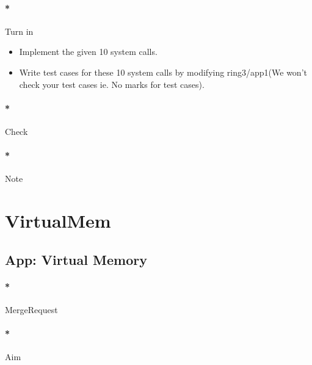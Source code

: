 \documentclass[]{article}
\newenvironment{Shaded}{}{}
\newcommand{\ExtensionTok}[1]{{#1}}
\newcommand{\NormalTok}[1]{{#1}}
\providecommand{\tightlist}{%
  \setlength{\itemsep}{0pt}\setlength{\parskip}{0pt}}
\let\oldparagraph\paragraph
\renewcommand{\paragraph}[1]{\oldparagraph{#1}\mbox{}}
\begin{document}
\paragraph*{Turn in}\label{turn-in-12}

\begin{itemize}
\tightlist
\item
  Implement the given 10 system calls.
\item
  Write test cases for these 10 system calls by modifying ring3/app1(We
  won't check your test cases ie. No marks for test cases).
\end{itemize}

\paragraph*{Check}\label{check-12}

\paragraph*{Note}\label{note-14}

\section{VirtualMem}\label{virtualmem}

\subsection{App: Virtual Memory}\label{app-virtual-memory}

\paragraph*{MergeRequest}\label{mergerequest-13}

\begin{Shaded}
\end{Shaded}

\paragraph*{Aim}\label{aim-13}
\end{document}
